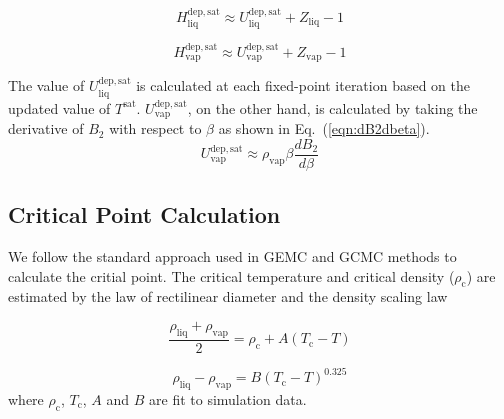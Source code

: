 \documentclass[5p,times]{elsarticle}
\begin{document}
\begin{equation}
H^{\mathrm{dep,sat}}_\mathrm{liq} \approx U^{\mathrm{dep, sat}}_\mathrm{liq}+Z_\mathrm{liq} - 1
\label{eqn:HsatLiq}
\end{equation}

\begin{equation}
H^{\mathrm{dep,sat}}_\mathrm{vap} \approx U^{\mathrm{dep, sat}}_\mathrm{vap}+Z_\mathrm{vap} - 1
\label{eqn:HsatVap}
\end{equation}

The value of $U^{\mathrm{dep, sat}}_\mathrm{liq}$ is calculated at each fixed-point iteration based on the updated value of $T^{\mathrm{sat}}$. $U^{\mathrm{dep, sat}}_\mathrm{vap}$, on the other hand, is calculated by taking the derivative of $B_2$ with respect to $\beta$ as shown in Eq.~(\ref{eqn:dB2dbeta}).
\begin{equation}
U^{\mathrm{dep, sat}}_\mathrm{vap}\approx \rho_{\mathrm{vap}} \beta \frac{dB_2}{d\beta}
\label{eqn:dB2dbeta}
\end{equation}

\subsection{Critical Point Calculation}\label{sec:PcCalc}
We follow the standard approach used in GEMC and GCMC methods to calculate the critial point. The critical temperature and critical density ($\rho_\mathrm{c}$) are estimated by the law of rectilinear diameter \cite{Rowlinson1982} and the density scaling law \cite{Rowlinson2013}

\begin{equation}
\frac{\rho_{\mathrm{liq}} +\rho_{\mathrm{vap}}}{2}=\rho_\mathrm{c}+A(T_\mathrm{c}-T)
\label{eqn:rectilinearLaw}
\end{equation}

\begin{equation}
\rho_{\mathrm{liq}} -\rho_{\mathrm{vap}}=B(T_\mathrm{c}-T)^{0.325}
\label{eqn:scalingLaw}
\end{equation}
where $\rho_\mathrm{c}$, $ T_\mathrm{c}$, $A$ and $B$ are fit to simulation data.

			
\end{document}
